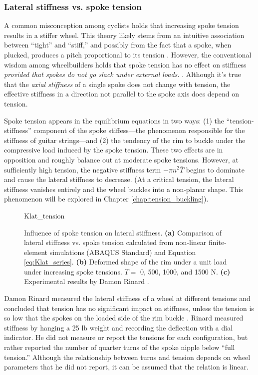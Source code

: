 \documentclass[\rootdir/thesis.tex]{subfiles}
\begin{document}
\subsubsection{Lateral stiffness vs. spoke tension}

A common misconception among cyclists holds that increasing spoke tension results in a stiffer wheel. This theory likely stems from an intuitive association between ``tight'' and ``stiff,'' and possibly from the fact that a spoke, when plucked, produces a pitch proportional to its tension \cite{Allen1997}. However, the conventional wisdom among wheelbuilders holds that spoke tension has no effect on stiffness \emph{provided that spokes do not go slack under external loads.} \cite{Rinard,Kopecky2013,Hjertberg2014}. Although it's true that the \emph{axial stiffness} of a single spoke does not change with tension, the effective stiffness in a direction not parallel to the spoke axis does depend on tension.

Spoke tension appears in the equilibrium equations in two ways: (1) the ``tension-stiffness'' component of the spoke stiffess---the phenomenon responsible for the stiffness of guitar strings---and (2) the tendency of the rim to buckle under the compressive load induced by the spoke tension. These two effects are in opposition and roughly balance out at moderate spoke tensions. However, at sufficiently high tension, the negative stiffness term $-\pi n^2 \bar{T}$ begins to dominate and cause the lateral stiffness to decrease. (At a critical tension, the lateral stiffness vanishes entirely and the wheel buckles into a non-planar shape. This phenomenon will be explored in Chapter \ref{chap:tension_buckling}).

\begin{figure}[h]
\centering
{Klat_tension}
\caption{Influence of spoke tension on lateral stiffness. \textbf{(a)} Comparison of lateral stiffness vs. spoke tension calculated from non-linear finite-element simulations (ABAQUS Standard) and Equation \eqref{eq:Klat_series}. \textbf{(b)} Deformed shape of the rim under a unit load under increasing spoke tensions. $T=\,\,$0, 500, 1000, and 1500 N. \textbf{(c)} Experimental results by Damon Rinard \cite{Rinard}.}
\label{fig:Klat_tension}
\end{figure}

Damon Rinard measured the lateral stiffness of a wheel at different tensions and concluded that tension has no significant impact on stiffness, unless the tension is so low that the spokes on the loaded side of the rim buckle \cite{Rinard}. Rinard measured stiffness by hanging a 25 lb weight and recording the deflection with a dial indicator. He did not measure or report the tensions for each configuration, but rather reported the number of quarter turns of the spoke nipple below ``full tension.'' Although the relationship between turns and tension depends on wheel parameters that he did not report, it can be assumed that the relation is linear.
\end{document}
